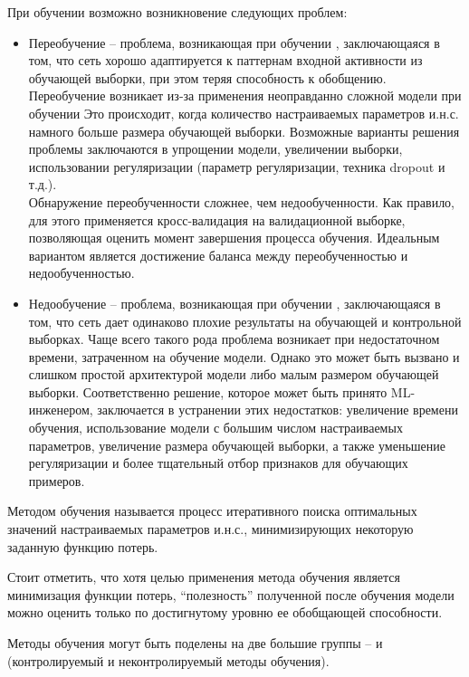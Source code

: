 При обучении возможно возникновение следующих проблем:

\begin{itemize}
	\item Переобучение -- проблема, возникающая при обучении  , заключающаяся в том,
	что сеть хорошо адаптируется к паттернам входной активности из обучающей выборки, при этом теряя способность к обобщению.
	Переобучение возникает из-за применения неоправданно сложной модели при обучении   Это происходит,
	когда количество настраиваемых параметров и.н.с. намного больше размера обучающей выборки. Возможные
	варианты решения проблемы заключаются в упрощении модели, увеличении выборки, использовании регуляризации
	(параметр регуляризации, техника dropout и т.д.).\\
	Обнаружение переобученности сложнее, чем недообученности. Как правило, для этого применяется
	кросс-валидация на валидационной выборке, позволяющая оценить момент завершения процесса обучения.
	Идеальным вариантом является достижение баланса между переобученностью и недообученностью.

	\item Недообучение -- проблема, возникающая при обучении  , заключающаяся в том,
	что сеть дает одинаково плохие результаты на обучающей и контрольной выборках.
	Чаще всего такого рода проблема возникает при недостаточном времени, затраченном на обучение модели.
	Однако это может быть вызвано и слишком простой архитектурой модели либо малым размером обучающей
	выборки. Соответственно решение, которое может быть принято ML-инженером, заключается в устранении
	этих недостатков: увеличение времени обучения, использование модели с большим числом настраиваемых
	параметров, увеличение размера обучающей выборки, а также уменьшение регуляризации и более тщательный
	отбор признаков для обучающих примеров.
\end{itemize}

Методом обучения  называется процесс итеративного поиска оптимальных значений настраиваемых параметров и.н.с., минимизирующих некоторую заданную функцию потерь.

Стоит отметить, что хотя целью применения метода обучения является минимизация функции потерь, ``полезность'' полученной после обучения модели можно оценить только по достигнутому уровню ее обобщающей способности.

Методы обучения могут быть поделены на две большие группы --  и  (контролируемый и неконтролируемый методы обучения).

